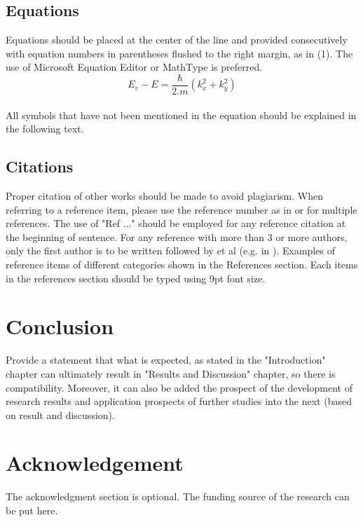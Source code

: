\documentclass{iaesarticle3ol}
\begin{document}
\subsection{Equations}
Equations should be placed at the center of the line and provided consecutively with equation numbers in parentheses flushed to the right margin, as in (1). The use of Microsoft Equation Editor or MathType is preferred.
\\
\begin{equation}
E_v - E = \frac{\hbar}{2.m}(k_x^2 + k_y^2)
\end{equation}
\\
All symbols that have not been mentioned in the equation should be explained in the following text.

\subsection{Citations}
Proper citation of other works should be made to avoid plagiarism. When referring to a reference item, please use the reference number as in \cite{Li} or \cite{Li, Arulmozhiyal, Zhang, Yinhai, lamport, knuth} for multiple references. The use of "Ref \cite{lamport}..." should be employed for any reference citation at the beginning of sentence. For any reference with more than 3 or more authors, only the first author is to be written followed by et al (e.g. in \cite{Yinhai}).  Examples of reference items of different categories shown in the References section. Each items in the references section should be typed using 9pt font size.

\section{Conclusion}
\label{}
Provide a statement that what is expected, as stated in the "Introduction" chapter can ultimately result in "Results and Discussion" chapter, so there is compatibility. Moreover, it can also be added the prospect of the development of research results and application prospects of further studies into the next (based on result and discussion).

\section*{Acknowledgement}
\label{}
The acknowledgment section is optional. The funding source of the research can be put here.

\end{document}
